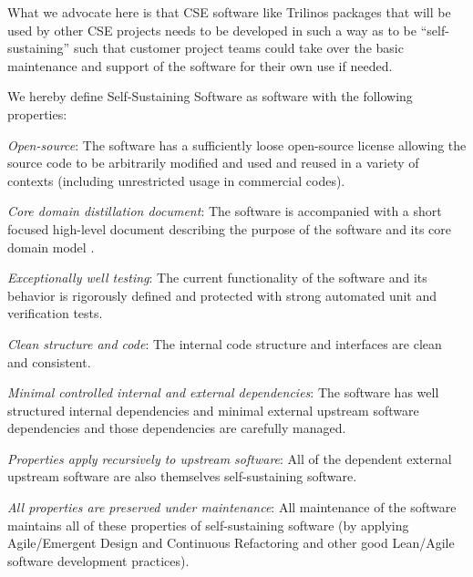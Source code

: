 \documentclass[11pt]{SANDreport}
\begin{document}
What we advocate here is that CSE software like Trilinos packages that
will be used by other CSE projects needs to be developed in such a way
as to be ``self-sustaining'' such that customer project teams could
take over the basic maintenance and support of the software for their
own use if needed.

We hereby define Self-Sustaining Software as software with the
following properties:
%
\begin{compactitem}

{}\item\textit{Open-source}: The software has a sufficiently loose
open-source license allowing the source code to be arbitrarily modified
and used and reused in a variety of contexts (including unrestricted
usage in commercial codes).

{}\item\textit{Core domain distillation document}: The software is
accompanied with a short focused high-level document describing the
purpose of the software and its core domain model
{}\cite{DomainDrivenDesign}.

{}\item\textit{Exceptionally well testing}: The current functionality
of the software and its behavior is rigorously defined and protected
with strong automated unit and verification tests.

{}\item\textit{Clean structure and code}: The internal code structure
and interfaces are clean and consistent.

{}\item\textit{Minimal controlled internal and external dependencies}:
The software has well structured internal dependencies and minimal
external upstream software dependencies and those dependencies are
carefully managed.

{}\item\textit{Properties apply recursively to upstream software}: All
of the dependent external upstream software are also themselves
self-sustaining software.

{}\item\textit{All properties are preserved under maintenance}: All
maintenance of the software maintains all of these properties of
self-sustaining software (by applying Agile/Emergent Design and
Continuous Refactoring and other good Lean/Agile software development
practices).

\end{compactitem}
\end{document}

